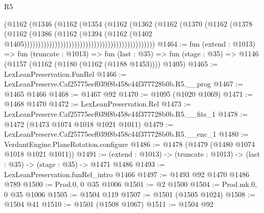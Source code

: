 \begin{lexlean}{R5}
\begin{coremodule}
                                                                  (@1162
                                                                    (@1346
                                                                      (@1162
                                                                        (@1354
                                                                          (@1162
                                                                            (@1362
                                                                              (@1162
                                                                                (@1370
                                                                                  (@1162
                                                                                    (@1378
                                                                                      (@1162
                                                                                        (@1386
                                                                                          (@1162
                                                                                            (@1394
                                                                                              (@1162
                                                                                                (@1402
                                                                                                  @1405)))))))))))))))))))))))))))))))))))))))))))))))
@1464 := fun (extend : @1013) =>
  fun (truncate : @1013) =>
  fun (last : @35) => fun (stage : @35) => @1146 (@1157 (@1162 (@1180 (@1162 (@1188 @1453)))) @1405)
@1465 := LexLeanPreservation.FunRel
@1466 := LexLeanPreserve.Caf25775eef039f8b458c44f377728b0b.R5.__prog
@1467 := @1465 @1466
@1468 := @1467 @92
@1470 := @1095 (@1020 @1069)
@1471 := @1468 @1470
@1472 := LexLeanPreservation.Rel
@1473 := LexLeanPreserve.Caf25775eef039f8b458c44f377728b0b.R5.__fits_1
@1478 := @1472 (@1473 @1074 @1018 @1021 @1011)
@1479 := LexLeanPreserve.Caf25775eef039f8b458c44f377728b0b.R5.__enc_1
@1480 := VerdantEngine.PlaneRotation.configure
@1486 := @1478 (@1479 (@1480 @1074 @1018 @1021 @1011))
@1491 := (extend : @1013) -> (truncate : @1013) -> (last : @35) -> (stage : @35) -> @1471 @1486
@1493 := LexLeanPreservation.funRel_intro @1466
@1497 := @1493 @92 @1470 @1486 @789
@1500 := Prod.{0, 0} @35 @1006
@1501 := @2 @1500
@1504 := Prod.mk.{0, 0} @35 @1006
@1505 := @1504 @119
@1507 := @1501 (@1505 @1024)
@1508 := @1504 @41
@1510 := @1501 (@1508 @1067)
@1511 := @1504 @92

\end{coremodule}
\end{lexlean}
